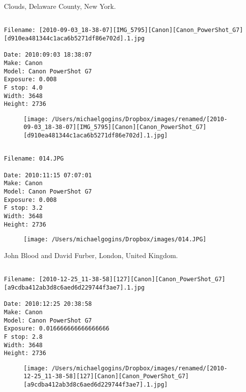 \documentclass[11pt,letter,DIV=14,paper=landscape]{scrbook}
\begin{document}
\clearpage
\noindent Clouds, Delaware County, New York.
\noindent
\begin{lstlisting}

Filename: [2010-09-03_18-38-07][IMG_5795][Canon][Canon_PowerShot_G7][d910ea481344c1aca6b5271df86e702d].1.jpg

Date: 2010:09:03 18:38:07
Make: Canon
Model: Canon PowerShot G7
Exposure: 0.008
F stop: 4.0
Width: 3648
Height: 2736
\end{lstlisting}
\clearpage

\begin{figure}
\texttt{[image: /Users/michaelgogins/Dropbox/images/renamed/[2010-09-03\_18-38-07][IMG\_5795][Canon][Canon\_PowerShot\_G7][d910ea481344c1aca6b5271df86e702d].1.jpg]}
\end{figure}
    
\clearpage
\noindent 
\noindent
\begin{lstlisting}

Filename: 014.JPG

Date: 2010:11:15 07:07:01
Make: Canon
Model: Canon PowerShot G7
Exposure: 0.008
F stop: 3.2
Width: 3648
Height: 2736
\end{lstlisting}
\clearpage

\begin{figure}
\texttt{[image: /Users/michaelgogins/Dropbox/images/014.JPG]}
\end{figure}
    
\clearpage
\noindent John Blood and David Furber, London, United Kingdom.
\noindent
\begin{lstlisting}

Filename: [2010-12-25_11-38-58][127][Canon][Canon_PowerShot_G7][a9cdba412ab3d8c6aed6d229744f3ae7].1.jpg

Date: 2010:12:25 20:38:58
Make: Canon
Model: Canon PowerShot G7
Exposure: 0.016666666666666666
F stop: 2.8
Width: 3648
Height: 2736
\end{lstlisting}
\clearpage

\begin{figure}
\texttt{[image: /Users/michaelgogins/Dropbox/images/renamed/[2010-12-25\_11-38-58][127][Canon][Canon\_PowerShot\_G7][a9cdba412ab3d8c6aed6d229744f3ae7].1.jpg]}
\end{figure}
    
\end{document}

